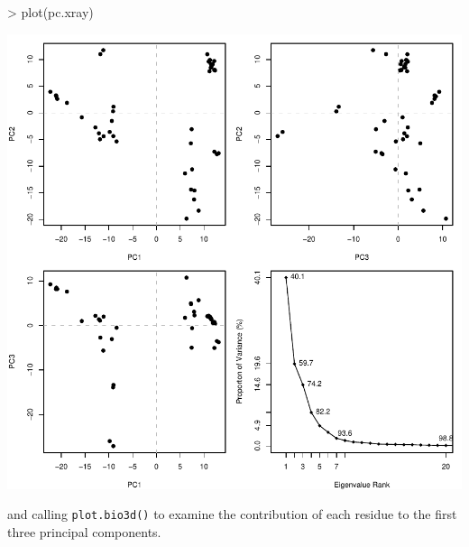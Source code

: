 \documentclass[a4paper]{article}
\begin{document}
\begin{center}
\begin{Schunk}
\begin{Sinput}
> plot(pc.xray)
\end{Sinput}
\end{Schunk}
\includegraphics{figs/fig-016}
\end{center}

and calling  \texttt{plot.bio3d()} to examine the contribution of each residue to the first three principal components.
\end{document}
